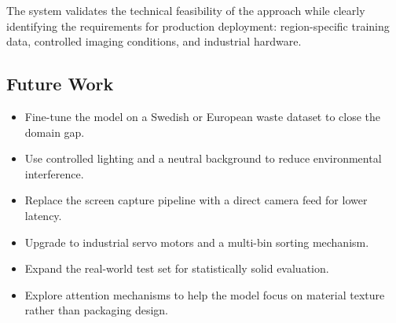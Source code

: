 \documentclass[11pt,a4paper]{article}
\begin{document}
The system validates the technical feasibility of the approach while clearly identifying the requirements for production deployment: region-specific training data, controlled imaging conditions, and industrial hardware.

\subsection{Future Work}

\begin{itemize}
  \item Fine-tune the model on a Swedish or European waste dataset to close the domain gap.
  \item Use controlled lighting and a neutral background to reduce environmental interference.
  \item Replace the screen capture pipeline with a direct camera feed for lower latency.
  \item Upgrade to industrial servo motors and a multi-bin sorting mechanism.
  \item Expand the real-world test set for statistically solid evaluation.
  \item Explore attention mechanisms to help the model focus on material texture rather than packaging design.
\end{itemize}



\end{document}
